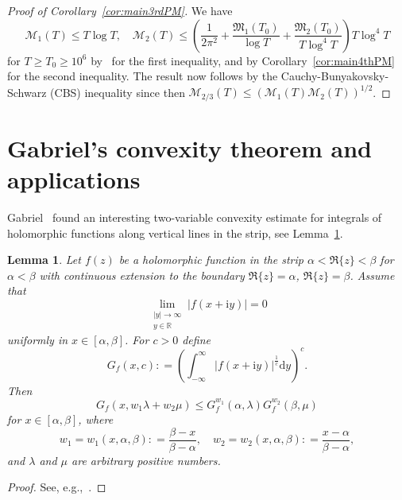 \documentclass[a4paper,reqno]{amsart}
\newtheorem{lemma}[theorem]{Lemma}
\theoremstyle{definition}
\newcommand{\R}{\mathbb{R}}
\newcommand{\de}[0]{\mathrel{\mathop:}=}
\newcommand{\ie}[0]{\mathrm{i}}
\newcommand{\dif}[1]{\mathrm{d}#1}
\begin{document}
\begin{proof}[Proof of Corollary~\ref{cor:main3rdPM}]
We have
\[
\mathcal{M}_{1}(T)\leq T\log{T}, \quad \mathcal{M}_{2}(T)\leq \left(\frac{1}{2\pi^2}+\frac{\mathfrak{M}_{1}(T_0)}{\log{T}}+\frac{\mathfrak{M}_{2}(T_0)}{T\log^{4}{T}}\right)T\log^{4}{T}
\]
for $T\geq T_0\geq 10^6$ by~\cite[Theorem~3.4]{DonaZunigaAlterman} for the first inequality, and by Corollary~\ref{cor:main4thPM} for the second inequality. The result now follows by the Cauchy-Bunyakovsky-Schwarz (CBS) inequality since then $\mathcal{M}_{2/3}(T)\leq \left(\mathcal{M}_{1}(T)\mathcal{M}_{2}(T)\right)^{1/2}$.
\end{proof}

\section{Gabriel's convexity theorem and applications}
\label{sec:Gabriel}

Gabriel~\cite[Theorem 2]{Gabriel27} found an interesting two-variable convexity estimate for integrals of holomorphic functions along vertical lines in the strip, see Lemma~\ref{lem:Gabriel}.

\begin{lemma}
\label{lem:Gabriel}
Let $f(z)$ be a holomorphic function in the strip $\alpha<\Re\{z\}<\beta$ for $\alpha<\beta$ with continuous extension to the boundary $\Re\{z\}=\alpha$, $\Re\{z\}=\beta$. Assume that 
\[
\lim_{\substack{|y|\to\infty \\ y\in\R}}|f(x+\ie y)|=0
\]
uniformly in $x\in[\alpha,\beta]$. For $c>0$ define
\begin{equation}
\label{eq:integral1}
G_{f}(x,c)\de \left(\int_{-\infty}^{\infty} \left|f(x+\ie y)\right|^{\frac{1}{c}} \dif{y}\right)^{c}.
\end{equation}
Then
\begin{equation}
\label{eq:Gabriel}
G_{f}(x, w_{1}\lambda + w_{2}\mu) \leq G_{f}^{w_{1}} ( \alpha, \lambda) G_{f}^{w_{2}}( \beta, \mu)
\end{equation}
for $x\in[\alpha,\beta]$, where
\begin{equation}
\label{eq:w1w2}
w_{1} = w_1(x,\alpha,\beta) \de \frac{\beta-x}{\beta- \alpha}, \quad  w_{2} = w_2(x,\alpha,\beta) \de \frac{x-\alpha}{\beta-\alpha},
\end{equation}
and $\lambda$ and $\mu$ are arbitrary positive numbers.
\end{lemma}

\begin{proof}
See, e.g.,~\cite[pp.~381--384]{KaratsubaVoronin}.
\end{proof}
\end{document}
